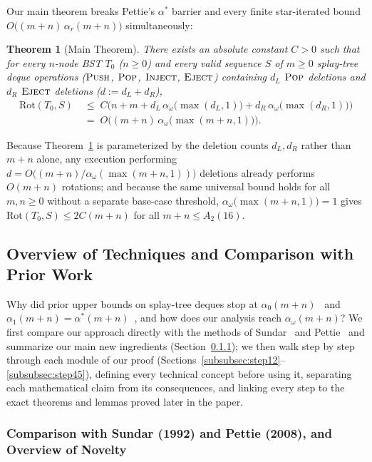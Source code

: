 \documentclass[11pt]{article}
\newtheorem{theorem}{Theorem}[section]
\theoremstyle{definition}
\theoremstyle{remark}
\newcommand{\Rot}{\mathrm{Rot}}
\newcommand{\PUSH}{\textnormal{\scshape Push}}
\newcommand{\POP}{\textnormal{\scshape Pop}}
\newcommand{\INJECT}{\textnormal{\scshape Inject}}
\newcommand{\EJECT}{\textnormal{\scshape Eject}}
\begin{document}
Our main theorem breaks Pettie's $\alpha^*$ barrier and every finite star-iterated bound $O\big((m + n)\,\alpha_r(m + n)\big)$ simultaneously:

\begin{theorem}[Main Theorem]
\label{thm:main}
There exists an absolute constant $C > 0$ such that for every $n$-node BST $T_0$ ($n \ge 0$) and every valid sequence $S$ of $m \ge 0$ splay-tree deque operations ($\PUSH$, $\POP$, $\INJECT$, $\EJECT$) containing $d_L$ $\POP$ deletions and $d_R$ $\EJECT$ deletions ($d := d_L + d_R$),
\begin{align*}
\Rot(T_0, S)
&\;\le\; C\Big(n + m + d_L\,\alpha_\omega\big(\max(d_L, 1)\big) + d_R\,\alpha_\omega\big(\max(d_R, 1)\big)\Big)\\
&\;=\; O\!\Big((m + n)\,\alpha_\omega\big(\max(m + n, 1)\big)\Big).
\end{align*}
\end{theorem}

Because Theorem~\ref{thm:main} is parameterized by the deletion counts $d_L, d_R$ rather than $m + n$ alone, any execution performing $d = O\big((m + n)/\alpha_\omega(\max(m + n, 1))\big)$ deletions already performs $O(m + n)$ rotations; and because the same universal bound holds for all $m, n \ge 0$ without a separate base-case threshold, $\alpha_\omega\big(\max(m + n, 1)\big) = 1$ gives $\Rot(T_0, S) \le 2C(m + n)$ for all $m + n \le A_2(16)$.

\subsection{Overview of Techniques and Comparison with Prior Work}
\label{subsec:techniques}

Why did prior upper bounds on splay-tree deques stop at $\alpha_0(m + n)$~\cite{Sundar1992} and $\alpha_1(m + n) = \alpha^*(m + n)$~\cite{Pettie2008}, and how does our analysis reach $\alpha_\omega(m + n)$? We first compare our approach directly with the methods of Sundar~\cite{Sundar1992} and Pettie~\cite{Pettie2008} and summarize our main new ingredients (Section~\ref{subsubsec:prior-and-novelty}); we then walk step by step through each module of our proof (Sections~\ref{subsubsec:step12}--\ref{subsubsec:step45}), defining every technical concept before using it, separating each mathematical claim from its consequences, and linking every step to the exact theorems and lemmas proved later in the paper.

\subsubsection{Comparison with Sundar (1992) and Pettie (2008), and Overview of Novelty}
\label{subsubsec:prior-and-novelty}
\end{document}
